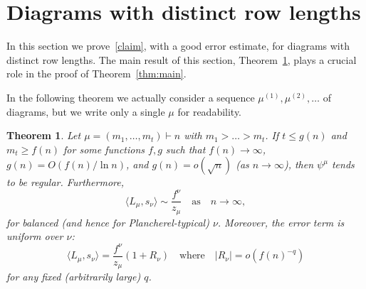 \documentclass[12pt]%
{amsart}
\newcommand{\la}{{\lambda}}
\theoremstyle{plain}
\newtheorem{theorem}{Theorem}[section]
\newtheorem{conjecture}[theorem]{Conjecture}
\theoremstyle{definition}
\theoremstyle{remark}
\newcommand{\todo}[1]{\vspace{5 mm}\par \noindent
	\marginpar{\textsc{ToDo}} \framebox{\begin{minipage}[c]{0.95
				\textwidth}
			#1 \end{minipage}}\vspace{5 mm}\par}
\begin{document}




\section{%
Diagrams with distinct row lengths}\label{sec:distinct}


In this section we prove~\eqref{claim}, with a good error estimate, for 
diagrams with distinct row lengths. The main result of this section, Theorem~\ref{thm:distinct}, plays a crucial role in the proof of Theorem~\ref{thm:main}. 

In the following theorem we actually consider a sequence $\mu^{(1)}, \mu^{(2)}, \dots$ of diagrams, but we write only a single $\mu$ for readability.

\begin{theorem}\label{thm:distinct}
    Let $\mu =(m_1, \dots, m_t) \vdash n$ with $m_1 > \dots > m_t$. 
    If $t\le g(n)$ and $m_t\ge f(n)$ for some functions $f,g$ such that $f(n) \to \infty$, $g(n) = O(f(n) / \ln n)$, and $g(n) = o(\sqrt n)$ (as $n \to \infty$), then $\psi^\mu$ tends to be regular. Furthermore,
    \[
        \langle L_{\mu},s_\nu \rangle 
        \sim \frac{f^\nu}{z_{\mu}} 
        \quad \text{as} \quad n\to \infty,
    \]
    for balanced (and hence for Plancherel-typical) $\nu$.
    Moreover, the error term is uniform over $\nu$:
    \[
        \langle L_{\mu}, s_\nu \rangle 
        = \frac{f^\nu}{z_{\mu}} (1+R_\nu)
        \quad \text{where} \quad |R_\nu| = o(f(n)^{-q})
    \]
    for any fixed (arbitrarily large) $q$.
\end{theorem}
\end{document}
